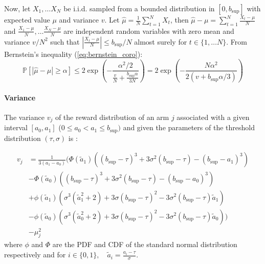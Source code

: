 \documentclass{statsmsc}
\begin{document}
Now, let  $X_1, \dots X_N$ be i.i.d. sampled from a bounded distribution in $[0,b_{\sup}]$ with expected value $\mu$ and variance $v$. 
Let $\hat{\mu} = \frac{1}{N}\sum_{t = 1}^N X_t$, then $\hat{\mu} - \mu = \sum_{t=1}^{N}\frac{X_t - \mu}{N}$ and $\frac{X_1 - \mu}{N}, \dots \frac{X_N - \mu}{N}$ are independent random variables with zero mean and variance $v/N^2$ such that $\left|\frac{X_t - \mu}{N}\right|\leq b_{\sup}/N$ almost surely for $t \in \{1, \dots N\}$.
From Bernstein's inequality (\ref{eq:bernstein_coro}):
\begin{equation}
  \mathbb{P}\left[\left|\hat{\mu} - \mu\right|\geq \alpha\right]\leq 2 \exp\left(-\frac{\alpha^2/2}{\frac{v}{N}+ \frac{b_{\sup} \alpha}{3N}}\right) = 2 \exp\left(-\frac{N \alpha^2}{2 \left(v+ b_{\sup} \alpha/3\right)}\right)
  \label{eq:bernstein}
\end{equation}

\paragraph*{Variance} The variance $v_j$ of the reward distribution of an arm $j$ associated with a given interval $\left[a_0, a_1 \right]$ ($0\leq a_0 < a_1 \leq b_{\sup})$ and given the parameters of the threshold distribution $(\tau, \sigma)$ is :

\begin{equation}
\begin{aligned}
  v_j & = \frac{1}{3(a_1 - a_0)}\biggl(\Phi\left(\tilde{a}_1\right) \left( (b_{\sup}- \tau)^3 +3 \sigma^2 (b_{\sup}- \tau) - (b_{\sup}-a_1)^3\right)\\
  & - \Phi\left(\tilde{a}_0\right) \left( (b_{\sup}- \tau)^3 +3 \sigma^2 (b_{\sup}- \tau) - (b_{\sup}-a_0)^3\right) \\
  & + \phi\left(\tilde{a}_1\right)\left( \sigma^3 \left(\tilde{a}_1^2 + 2 \right) + 3 \sigma (b_{\sup}- \tau)^2 - 3 \sigma^2 (b_{\sup}- \tau)\tilde{a}_1  \right) \\
  & - \phi\left(\tilde{a}_0\right)\left( \sigma^3 \left(\tilde{a}_0^2 + 2 \right) + 3 \sigma (b_{\sup}- \tau)^2 - 3 \sigma^2 (b_{\sup}- \tau)\tilde{a}_0  \right) \biggr) \\
  & - \mu_j^2
  \end{aligned}
  \label{eq:variance_reward}
\end{equation}
  where $\phi$ and $\Phi$ are the PDF and CDF of the standard normal distribution respectively and for $i \in \{0,1\}, \quad \tilde{a}_i = \frac{a_i - \tau}{\sigma}$.
\end{document}
